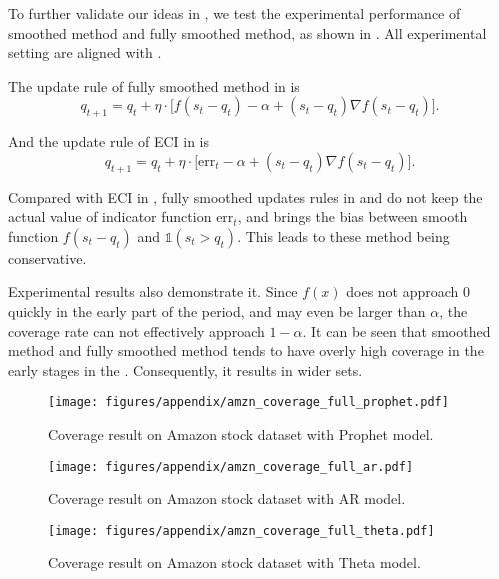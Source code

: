 To further validate our ideas in , we test the experimental performance of smoothed method and fully smoothed method, as shown in . All experimental setting are aligned with . 

The update rule of fully smoothed method in  is
$$
q_{t+1} = q_t + \eta \cdot \bigg[f(s_t-q_t) - \alpha+  (s_t-q_t) \nabla f(s_t-q_t)\bigg].
$$

And the update rule of ECI in  is
$$
q_{t+1} = q_t + \eta \cdot \bigg[\text{err}_t - \alpha+  (s_t-q_t) \nabla f(s_t-q_t)\bigg].
$$


Compared with ECI in , fully smoothed updates rules in  and  do not keep the actual value of indicator function $\text{err}_t$, and brings the bias between smooth function $f(s_t-q_t)$ and $\mathds{1}(s_t>q_t)$. This leads to these method being conservative.

Experimental results also demonstrate it. Since $f(x)$ does not approach $0$ quickly in the early part of the period, and may even be larger than $\alpha$, the coverage rate can not effectively approach $1-\alpha$. It can be seen that smoothed method and fully smoothed method tends to have overly high coverage in the early stages in the . Consequently, it results in wider sets.

\begin{figure*}[h]
  \centering
  \texttt{[image: figures/appendix/amzn\_coverage\_full\_prophet.pdf]}
  \caption{Coverage result on Amazon stock dataset with Prophet model.}
  \label{amzn_coverage_full_prophet}
\end{figure*}

\begin{figure*}[h]
  \centering
  \texttt{[image: figures/appendix/amzn\_coverage\_full\_ar.pdf]}
  \caption{Coverage result on Amazon stock dataset with AR model.}
  \label{amzn_coverage_full_ar}
\end{figure*}

\begin{figure*}[h]
  \centering
  \texttt{[image: figures/appendix/amzn\_coverage\_full\_theta.pdf]}
  \caption{Coverage result on Amazon stock dataset with Theta model.}
  \label{amzn_coverage_full_theta}
\end{figure*}


